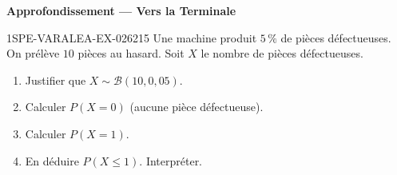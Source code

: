\begin{center}\textbf{Approfondissement — Vers la Terminale}\end{center}
\begin{exercice}{1SPE-VARALEA-EX-026}{2}{15}
Une machine produit $5\,\%$ de pièces défectueuses. On prélève $10$ pièces au hasard. Soit $X$ le nombre de pièces défectueuses.

\begin{enumerate}
  \item Justifier que $X \sim \mathcal{B}(10, 0{,}05)$.
  \item Calculer $P(X = 0)$ (aucune pièce défectueuse).
  \item Calculer $P(X = 1)$.
  \item En déduire $P(X \leq 1)$. Interpréter.
\end{enumerate}
\end{exercice}
